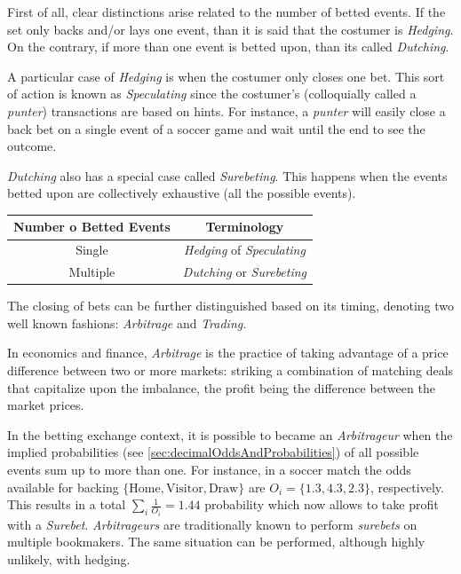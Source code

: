 \documentclass{article}
\begin{document}
First of all, clear distinctions arise related to the number of 
betted events. If the set only backs and/or lays one event, than it 
is said that the costumer is \emph{Hedging}. On the contrary, if 
more than one event is betted upon, than its called \emph{Dutching}.

A particular case of \emph{Hedging} is when the costumer only closes 
one bet. This sort of action is known as \emph{Speculating} since 
the costumer's (colloquially called a \emph{punter}) transactions 
are based on hints. For instance, a \emph{punter} will easily close 
a back bet on a single event of a soccer game and wait until the end 
to see the outcome.

\emph{Dutching} also has a special case called \emph{Surebeting}. 
This happens when the events betted upon are collectively exhaustive 
(all the possible events).

\begin{center}
    \begin{tabular}{ | c | c |}
        \hline
        Number o Betted Events & Terminology \\ \hline\hline
        Single & \emph{Hedging} of \emph{Speculating}\\ \hline
        Multiple & \emph{Dutching} or \emph{Surebeting}\\
        \hline
    \end{tabular}
\end{center}

The closing of bets can be further distinguished based on its 
timing, denoting two well known fashions: \emph{Arbitrage} and
\emph{Trading}.

In economics and finance, \emph{Arbitrage} is the practice of taking 
advantage of a price difference between two or more markets: 
striking a combination of matching deals that capitalize upon the 
imbalance, the profit being the difference between the market prices.

In the betting exchange context, it is possible to became an 
\emph{Arbitrageur} when the implied probabilities (see 
\ref{sec:decimalOddsAndProbabilities}) of all possible events sum up to 
more than one. For instance, in a soccer match the odds available 
for backing $\{\text{Home},\text{Visitor},\text{Draw}\}$ are $O_{i} 
= \{1.3, 4.3, 2.3\}$, respectively. This results in a total 
$\sum_{i} \frac{1}{O_{i}} = 1.44$ probability which now allows to 
take profit with a \emph{Surebet}. \emph{Arbitrageurs} are 
traditionally known to perform \emph{surebets} on multiple 
bookmakers. The same situation can be performed, although highly 
unlikely, with hedging. 
\end{document}
